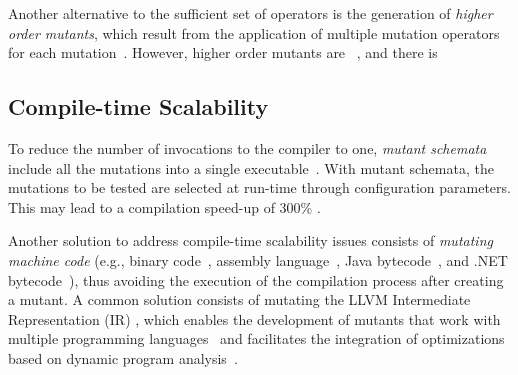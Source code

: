 Another alternative to the sufficient set of operators is the generation of \emph{higher order mutants}, which result from the application of multiple mutation operators for each mutation~\cite{jia2009higher,kintis2010evaluating,offutt1992investigations,papadakis2010empirical}. However, higher order mutants are ~\cite{papadakis2010mutation,papadakis2019mutation}, and there is



\subsection{Compile-time Scalability}
\label{sec:compile:time}



To reduce the number of invocations to the compiler to one, \emph{mutant schemata} include all the mutations into a single executable~\cite{untch1993mutation}.
With mutant schemata, the mutations to be tested are selected at run-time through configuration parameters. This may lead to a compilation speed-up of 300\% \cite{papadakis2010automatic}.


Another solution to address compile-time scalability issues consists of \emph{mutating machine code}  (e.g., binary code~\cite{becker2012xemu}, assembly language~\cite{crouzet2006sesame},
Java bytecode~\cite{ma2006mujava},
 and
.NET bytecode~\cite{derezinska2011object}), thus avoiding the execution of the compilation process after creating a mutant.
A common solution consists of mutating the
 LLVM Intermediate Representation (IR) \cite{hariri2016evaluating},
which enables the development of mutants that work with multiple programming languages~\cite{hariri2019comparing} and facilitates the integration of optimizations based on dynamic program analysis~\cite{denisov2018mull}.


